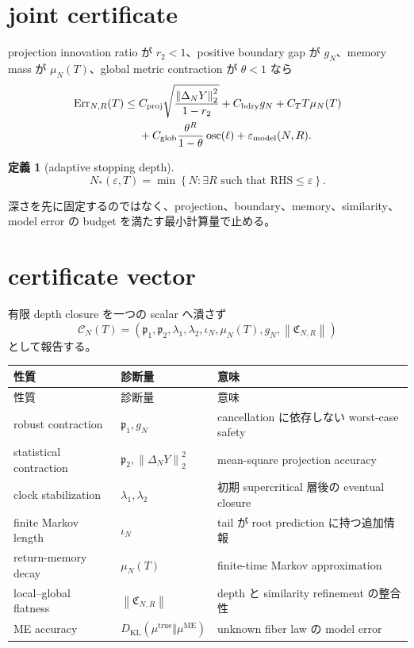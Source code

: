\documentclass[11pt,a4paper,openany]{book}
\newtheorem{definition}{定義}[chapter]
\numberwithin{equation}{chapter}
\newcommand{\KL}{D_{\mathrm{KL}}}
\newcommand{\cC}{\mathcal C}
\newcommand{\osc}{\operatorname{osc}}
\newcommand{\norm}[1]{\left\lVert #1\right\rVert}
\begin{document}
\section{joint certificate}
projection innovation ratio が $r_2<1$、positive boundary gap が $g_N$、memory mass が $\mu_N(T)$、global metric contraction が $\theta<1$ なら
\begin{align}
\operatorname{Err}_{N,R}(T)
\le{}&
C_{\mathrm{proj}}
\sqrt{\frac{\norm{\Delta_NY}_2^2}{1-r_2}}
+C_{\mathrm{bdry}}g_N
+C_TT\mu_N(T)
\notag\\
&+C_{\mathrm{glob}}
\frac{\theta^R}{1-\theta}\osc(\ell)
+\varepsilon_{\mathrm{model}}(N,R).
\end{align}

\begin{definition}[adaptive stopping depth]
\[
N_*(\varepsilon,T)
=\min\left\{N:\exists R\text{ such that RHS}\le\varepsilon\right\}.
\]
\end{definition}

深さを先に固定するのではなく、projection、boundary、memory、similarity、model error の budget を満たす最小計算量で止める。

\section{certificate vector}
有限 depth closure を一つの scalar へ潰さず
\[
\boxed{
\cC_N(T)
=\left(
\mathfrak p_1,
\mathfrak p_2,
\lambda_1,
\lambda_2,
\iota_N,
\mu_N(T),
g_N,
\norm{\mathfrak C_{N,R}}
\right)}
\]
として報告する。

\begin{longtable}{p{}p{}p{}}
\toprule
性質 & 診断量 & 意味 \\
\midrule
\endfirsthead
\toprule
性質 & 診断量 & 意味 \\
\midrule
\endhead
robust contraction & $\mathfrak p_1,g_N$ & cancellation に依存しない worst-case safety \\
statistical contraction & $\mathfrak p_2,\norm{\Delta_NY}_2^2$ & mean-square projection accuracy \\
clock stabilization & $\lambda_1,\lambda_2$ & 初期 supercritical 層後の eventual closure \\
finite Markov length & $\iota_N$ & tail が root prediction に持つ追加情報 \\
return-memory decay & $\mu_N(T)$ & finite-time Markov approximation \\
local--global flatness & $\norm{\mathfrak C_{N,R}}$ & depth と similarity refinement の整合性 \\
ME accuracy & $\KL(\mu^{\mathrm{true}}\Vert\mu^{\mathrm{ME}})$ & unknown fiber law の model error \\
\bottomrule
\end{longtable}
\end{document}
